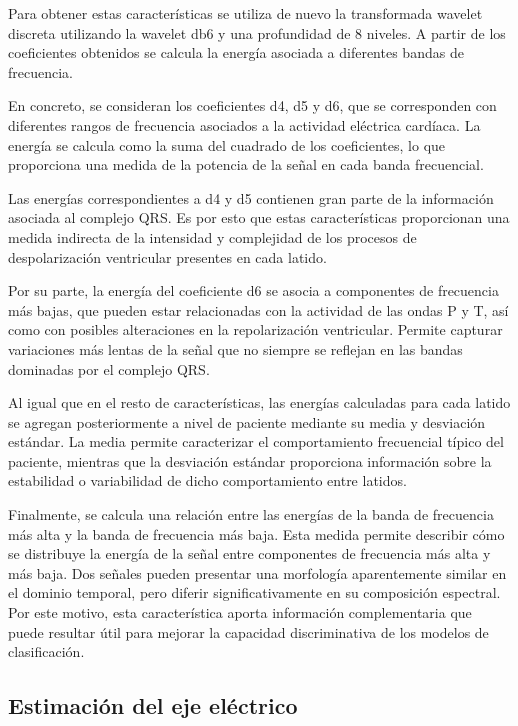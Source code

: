 \documentclass[12pt,a4paper,twoside]{book}
\begin{document}
Para obtener estas características se utiliza de nuevo la transformada wavelet discreta utilizando la wavelet db6 y una profundidad de 8 niveles.
A partir de los coeficientes obtenidos se calcula la energía asociada a diferentes bandas de frecuencia. 

En concreto, se consideran los coeficientes d4, d5 y d6, que se corresponden con diferentes rangos de frecuencia asociados a la actividad eléctrica cardíaca. 
La energía se calcula como la suma del cuadrado de los coeficientes, lo que proporciona una medida de la potencia de la señal en cada banda frecuencial.

Las energías correspondientes a d4 y d5 contienen gran parte de la información asociada al complejo QRS.
Es por esto que estas características proporcionan una medida indirecta de la intensidad y complejidad de los procesos de despolarización ventricular presentes en cada latido.

Por su parte, la energía del coeficiente d6 se asocia a componentes de frecuencia más bajas, que pueden estar relacionadas con la actividad de las ondas P y T, así como con posibles alteraciones en la repolarización ventricular.
Permite capturar variaciones más lentas de la señal que no siempre se reflejan en las bandas dominadas por el complejo QRS.

Al igual que en el resto de características, las energías calculadas para cada latido se agregan posteriormente a nivel de paciente mediante su media y desviación estándar. 
La media permite caracterizar el comportamiento frecuencial típico del paciente, mientras que la desviación estándar proporciona información sobre la estabilidad o variabilidad de dicho comportamiento entre latidos.

Finalmente, se calcula una relación entre las energías de la banda de frecuencia más alta y la banda de frecuencia más baja. 
Esta medida permite describir cómo se distribuye la energía de la señal entre componentes de frecuencia más alta y más baja. 
Dos señales pueden presentar una morfología aparentemente similar en el dominio temporal, pero diferir significativamente en su composición espectral. 
Por este motivo, esta característica aporta información complementaria que puede resultar útil para mejorar la capacidad discriminativa de los modelos de clasificación.

\subsection{Estimación del eje eléctrico}
\end{document}
